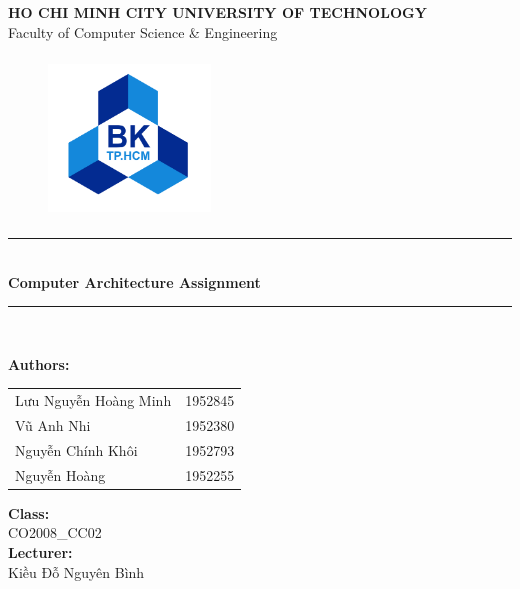 \documentclass[12pt,a4paper]{article}
\newcommand\HRule{\rule{12cm}{1pt}}
\begin{document}
\begin{titlepage}

  \begin{center}

    \textbf{\fontsize{12pt}{1pt}\selectfont HO CHI MINH CITY UNIVERSITY OF TECHNOLOGY}\\[0.5cm]
    {\fontsize{13pt}{1pt}\selectfont Faculty of Computer Science \& Engineering}\\[0.5cm]
    \begin{figure}[H]
      \centering
      \includegraphics[width=1.7in,height=1.7in]{BK.png}
    \end{figure}

    \HRule\\[0.5cm]
    { \textbf{\fontsize{25pt}{1pt}\selectfont Computer Architecture Assignment}}\\[0.4cm]

    \HRule\\[0.8cm]
    \begin{minipage}{0.545\textwidth}
      \begin{flushleft}
        \textbf{Authors:}\\
        \begin{tabular}{l l}
          Lưu Nguyễn Hoàng Minh & 1952845 \\
          Vũ Anh Nhi            & 1952380 \\
          Nguyễn Chính Khôi     & 1952793 \\
          Nguyễn Hoàng          & 1952255 \\
        \end{tabular}
      \end{flushleft}
    \end{minipage}
    \begin{minipage}{0.4\textwidth}
      \begin{flushright}
        \textbf{Class:}\\
        CO2008\_CC02\\
        \textbf{Lecturer:}\\
        Kiều Đỗ Nguyên Bình\\


\end{flushright}
\end{minipage}
\end{center}
\end{titlepage}
\end{document}
